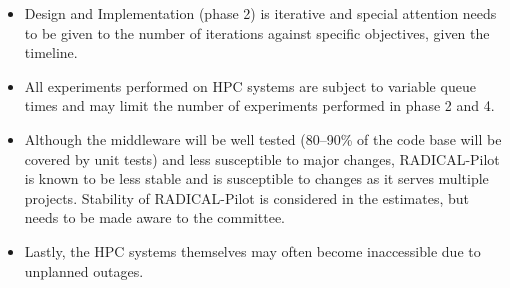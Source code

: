 \begin{itemize}
	\item Design and Implementation (phase 2) is iterative and special attention 
	needs to be given to the number of iterations against specific objectives, 
	given the timeline.
  \item All experiments performed on HPC systems are subject to variable queue 
	times and may limit the number of experiments performed in phase 2 and 4.
	\item Although the middleware will be well tested (80--90\% of the code base 
	will be covered by unit tests) and less susceptible to major changes, RADICAL-Pilot 
	is known to be less stable and is susceptible to changes as it serves multiple 
	projects. Stability of RADICAL-Pilot is considered in the estimates, but needs 
	to be made aware to the committee.
	\item Lastly, the HPC systems themselves may often become inaccessible due to 
	unplanned outages.
\end{itemize}



\textit{}